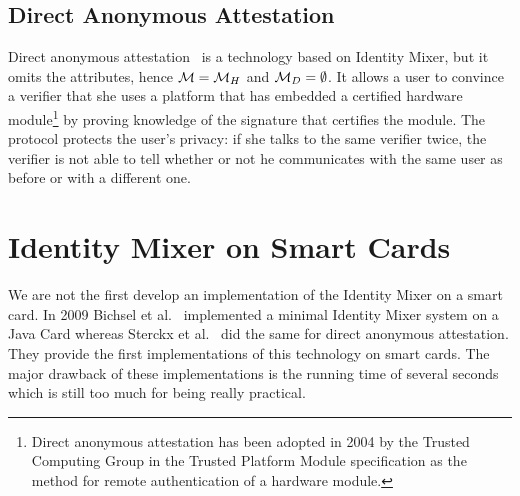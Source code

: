 \subsection{Direct Anonymous Attestation\label{sec:DAA}}
Direct anonymous attestation~\cite{BrickellCC04} is a technology based on
Identity Mixer, but it omits the attributes, hence $\mathcal{M} = \mathcal{M}_H$ and
$\mathcal{M}_D = \emptyset$. It allows a user to convince a verifier that she uses a
platform that has embedded a certified hardware module\footnote{Direct anonymous attestation has been adopted in 2004
by the Trusted Computing Group in the Trusted Platform Module specification as
the method for remote authentication of a hardware module.} by proving knowledge
of the signature that certifies the module. The protocol protects the user's
privacy: if she talks to the same verifier twice, the verifier is not able to
tell whether or not he communicates with the same user as before or with a
different one.

\section{Identity Mixer on Smart Cards}

We are not the first develop an implementation of the Identity Mixer on a smart
card. In 2009 Bichsel et al.~\cite{BichselCGS2009} implemented a minimal
Identity Mixer system on a Java Card whereas Sterckx et al.~\cite{Sterckx09}
did the same for direct anonymous attestation. They provide the first
implementations of this technology on smart cards. The major drawback of these
implementations is the running time of several seconds which is still too much
for being really practical.

